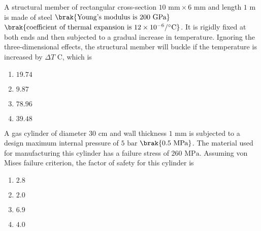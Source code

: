 \iffalse
                       
                        
                        
                        
                    
                        \author{AI24BTECH11006 - Bugada Roopansha}
                        \section{ae}
                        \chapter{2014}
                        \fi
 
    \item A structural member of rectangular cross-section $10 \text{ mm} \times 6 \text{ mm}$ and length $1 \text{ m}$ is made of steel $\brak{\text{Young's modulus is } 200 \text{ GPa}}$ $\brak{\text{coefficient of thermal expansion is } 12 \times 10^{-6}/^{\circ}\text{C}}$. It is rigidly fixed at both ends and then subjected to a gradual increase in temperature. Ignoring the three-dimensional effects, the structural member will buckle if the temperature is increased by $\Delta T$ \degree C, which is
	   





	    \begin{enumerate}
        \item $19.74$
        \item $9.87$
        \item $78.96$
        \item $39.48$
    \end{enumerate}


    \item A gas cylinder  of diameter $30 \text{ cm}$ and wall thickness $1 \text{ mm}$ is subjected to a design maximum internal pressure of $5 \text{ bar}$ $\brak{0.5 \text{ MPa}}$. The material used for manufacturing this cylinder has a failure stress of $260 \text{ MPa}$. Assuming von Mises failure criterion, the factor of safety  for this cylinder is
    \begin{enumerate}
        \item $2.8$
        \item $2.0$
        \item $6.9$
        \item $4.0$
    \end{enumerate}


